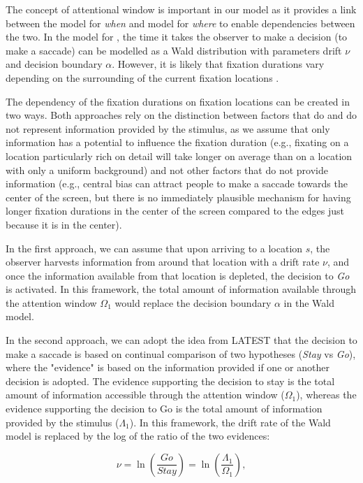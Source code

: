 \documentclass{article}
\begin{document}
The concept of attentional window is important in our model as it provides a link between the model for \textit{when} and model for \textit{where} to enable dependencies between the two. In the model for , the time it takes the observer to make a decision (to make a saccade) can be modelled as a Wald distribution with parameters drift $\nu$ and decision boundary $\alpha$. However, it is likely that fixation durations vary depending on the surrounding of the current fixation locations \citep{nuthmann2010crisp,nuthmann2017fixation_durations}. 

The dependency of the fixation durations on fixation locations can be created in two ways. Both approaches rely on the distinction between factors that do and do not represent information provided by the stimulus, as we assume that only information has a potential to influence the fixation duration (e.g., fixating on a location particularly rich on detail will take longer on average than on a location with only a uniform background) and not other factors that do not provide information (e.g., central bias can attract people to make a saccade towards the center of the screen, but there is no immediately plausible mechanism for having longer fixation durations in the center of the screen compared to the edges just because it is in the center).

In the first approach, we can assume that upon arriving to a location $s$, the observer harvests information from around that location with a drift rate $\nu$, and once the information available from that location is depleted, the decision to \textit{Go} is activated. In this framework, the total amount of information available through the attention window $\Omega_1$ would replace the decision boundary $\alpha$ in the Wald model.

In the second approach, we can adopt the idea from LATEST \citep{tatler2017latest} that the decision to make a saccade is based on continual comparison of two hypotheses (\textit{Stay} vs \textit{Go}), where the "evidence" is based on the information provided if one or another decision is adopted. The evidence supporting the decision to stay is the total amount of information accessible through the attention window ($\Omega_1$), whereas the evidence supporting the decision to Go is the total amount of information provided by the stimulus ($\Lambda_1$). In this framework, the drift rate of the Wald model is replaced by the log of the ratio of the two evidences:

\begin{equation}
\nu = \ln\left(\frac{Go}{Stay}\right) = \ln\left(\frac{\Lambda_1}{\Omega_1}\right),
\end{equation}
\end{document}
